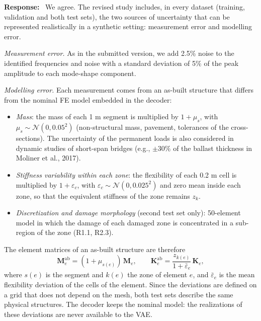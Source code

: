 \documentclass[11pt]{article}
\newenvironment{response}{\par\smallskip\noindent\color{resp}\textbf{Response:}\ }{\par}
\begin{document}
\begin{response}
We agree. The revised study includes, in every dataset (training, validation and both test sets), the two sources of
uncertainty that can be represented realistically in a synthetic setting: measurement error and modelling error.

\textit{Measurement error.} As in the submitted version, we add 2.5\% noise to the identified frequencies and noise with
a standard deviation of 5\% of the peak amplitude to each mode-shape component.

\textit{Modelling error.} Each measurement comes from an as-built structure that differs from the nominal FE model
embedded in the decoder:
\begin{itemize}[leftmargin=*]
\item \emph{Mass}: the mass of each 1 m segment is multiplied by $1+\mu_s$, with $\mu_s\sim\mathcal{N}(0,0.05^2)$
(non-structural mass, pavement, tolerances of the cross-sections). The uncertainty of the permanent loads is also
considered in dynamic studies of short-span bridges (e.g., $\pm30\%$ of the ballast thickness in Moliner et al., 2017).
\item \emph{Stiffness variability within each zone}: the flexibility of each 0.2 m cell is multiplied by
$1+\varepsilon_c$, with $\varepsilon_c\sim\mathcal{N}(0,0.025^2)$ and zero mean inside each zone, so that the
equivalent stiffness of the zone remains $z_k$.
\item \emph{Discretization and damage morphology} (second test set only): 50-element model in which the damage of each
damaged zone is concentrated in a sub-region of the zone (R1.1, R2.3).
\end{itemize}
The element matrices of an as-built structure are therefore
\begin{equation}
\mathbf{M}_e^{\mathrm{ab}}=(1+\mu_{s(e)})\,\mathbf{M}_e,\qquad
\mathbf{K}_e^{\mathrm{ab}}=\frac{z_{k(e)}}{1+\bar{\varepsilon}_e}\,\mathbf{K}_e ,
\label{eq:asbuilt}
\end{equation}
where $s(e)$ is the segment and $k(e)$ the zone of element $e$, and $\bar{\varepsilon}_e$ is the mean flexibility
deviation of the cells of the element. Since the deviations are defined on a grid that does not depend on the mesh,
both test sets describe the same physical structures. The decoder keeps the nominal model: the realizations of these
deviations are never available to the VAE.


\end{response}
\end{document}
